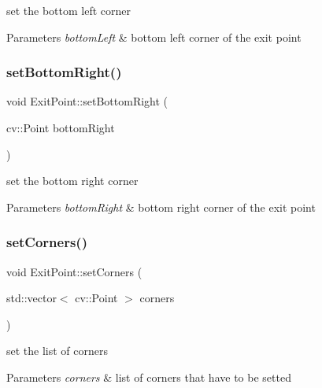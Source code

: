 set the bottom left corner 
\begin{DoxyParams}{Parameters}
{\em bottom\+Left} & bottom left corner of the exit point \\
\hline
\end{DoxyParams}
\mbox{\label{class_exit_point_afe10f2b0cf00b654dc1c95183462ed1a}} 
\subsubsection{\texorpdfstring{set\+Bottom\+Right()}{setBottomRight()}}
{\footnotesize\ttfamily void Exit\+Point\+::set\+Bottom\+Right (\begin{DoxyParamCaption}\item[{cv\+::\+Point}]{bottom\+Right }\end{DoxyParamCaption})}

set the bottom right corner 
\begin{DoxyParams}{Parameters}
{\em bottom\+Right} & bottom right corner of the exit point \\
\hline
\end{DoxyParams}
\mbox{\label{class_exit_point_aff4341c31734d77224b1251988949430}} 
\subsubsection{\texorpdfstring{set\+Corners()}{setCorners()}}
{\footnotesize\ttfamily void Exit\+Point\+::set\+Corners (\begin{DoxyParamCaption}\item[{std\+::vector$<$ cv\+::\+Point $>$}]{corners }\end{DoxyParamCaption})}

set the list of corners 
\begin{DoxyParams}{Parameters}
{\em corners} & list of corners that have to be setted \\
\hline
\end{DoxyParams}
\mbox{\label{class_exit_point_a31c88803968c8b215062b97b699721e2}} 
